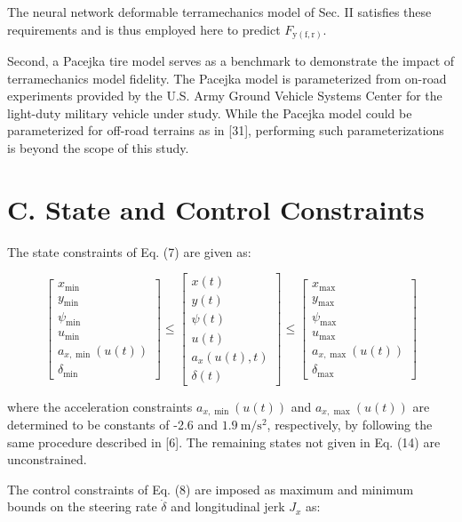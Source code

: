 \documentclass[10pt]{article}
\begin{document}
The neural network deformable terramechanics model of Sec. II satisfies these requirements and is thus employed here to predict $F_{\mathrm{y}(\mathrm{f}, \mathrm{r})}$.

Second, a Pacejka tire model serves as a benchmark to demonstrate the impact of terramechanics model fidelity. The Pacejka model is parameterized from on-road experiments provided by the U.S. Army Ground Vehicle Systems Center for the light-duty military vehicle under study. While the Pacejka model could be parameterized for off-road terrains as in [31], performing such parameterizations is beyond the scope of this study.

\section*{C. State and Control Constraints}
The state constraints of Eq. (7) are given as:

\[
\left[\begin{array}{c}
x_{\min }  \tag{14}\\
y_{\min } \\
\psi_{\min } \\
u_{\min } \\
a_{x, \min }(u(t)) \\
\delta_{\min }
\end{array}\right] \leq\left[\begin{array}{c}
x(t) \\
y(t) \\
\psi(t) \\
u(t) \\
a_{x}(u(t), t) \\
\delta(t)
\end{array}\right] \leq\left[\begin{array}{c}
x_{\max } \\
y_{\max } \\
\psi_{\max } \\
u_{\max } \\
a_{x, \max }(u(t)) \\
\delta_{\max }
\end{array}\right]
\]

where the acceleration constraints $a_{x, \min }(u(t))$ and $a_{x, \text { max }}(u(t))$ are determined to be constants of -2.6 and $1.9 \mathrm{~m} / \mathrm{s}^{2}$, respectively, by following the same procedure described in [6]. The remaining states not given in Eq. (14) are unconstrained.

The control constraints of Eq. (8) are imposed as maximum and minimum bounds on the steering rate $\dot{\delta}$ and longitudinal jerk $J_{x}$ as:
\end{document}
